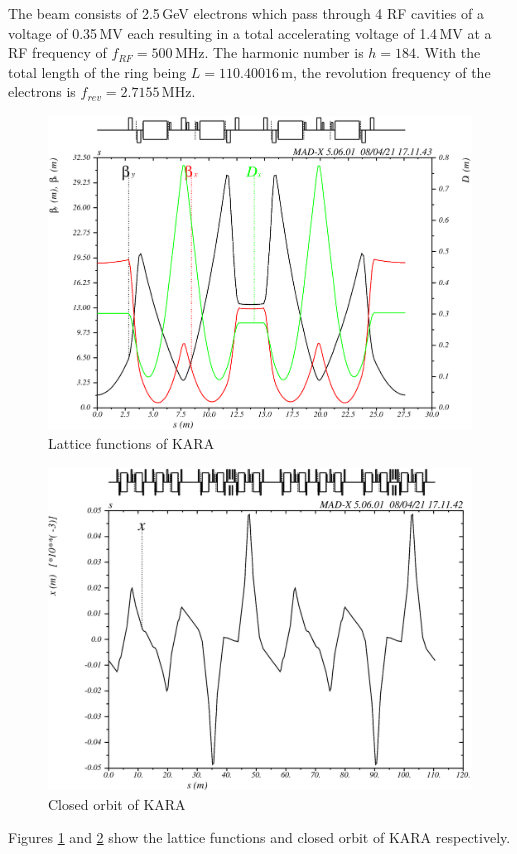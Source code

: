 The beam consists of 2.5\,GeV electrons which pass through 4 RF cavities of a voltage of 0.35\,MV each resulting in a total accelerating voltage of 1.4\,MV at a RF frequency of $f_{RF}=500\,\mathrm{MHz}$. The harmonic number is $h=184$.
With the total length of the ring being $L=110.40016\,\mathrm{m}$, the revolution frequency of the electrons is $f_{rev}=2.7155\,\mathrm{MHz}$.
\begin{figure}[tbp]
    \centering
    \includegraphics[width=0.8\linewidth]{../../part3/KARA_lattice_orig2.png}
    \caption{Lattice functions of KARA}
    \label{fig:KARAlattice2}
\end{figure}
\begin{figure}[tbp]
    \centering
    \includegraphics[width=0.8\linewidth]{../../part3/KARA_lattice_orig.png}
    \caption{Closed orbit of KARA}
    \label{fig:KARAlattice}
\end{figure}
\par
Figures \ref{fig:KARAlattice2} and \ref{fig:KARAlattice} show the lattice functions and closed orbit of KARA respectively.
